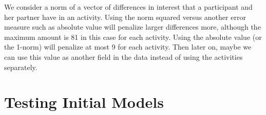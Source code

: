 \documentclass{article}
\begin{document}
We consider a norm of a vector of differences in interest that a participant and her partner have in an activity.  Using the norm squared versus another error measure such as absolute value will penalize larger differences more, although the maximum amount is 81 in this case for each activity. Using the absolute value (or the 1-norm) will penalize at most 9 for each activity. Then later on, maybe we can use this value as another field in the data instead of using the activities separately. \\
 
 \section{Testing Initial Models}
 
\end{document}
